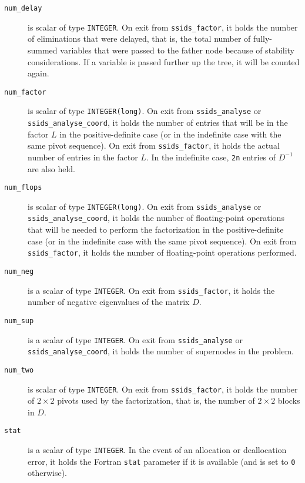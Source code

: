 \documentclass{spral}
\begin{document}
\begin{description}
\item[\texttt{num\_delay}] is scalar of type  {\tt INTEGER}. On exit from
{\tt ssids\_factor}, it holds the
number of eliminations that were
delayed, that is, the total number of fully-summed
variables that were passed to the father node because
of stability considerations. If a variable is passed
further up the tree, it will be counted again.

\item[\texttt{num\_factor}] is scalar of type {\tt INTEGER(long)}. On exit from
{\tt ssids\_analyse}  or {\tt ssids\_analyse\_coord}, it holds the number of entries that will be in the
factor $L$ in the positive-definite case (or in the indefinite case with
the same pivot sequence). On exit from
{\tt ssids\_factor},
it holds the actual number of entries in the factor
$L$. In the indefinite case, {\tt 2n} entries of ${D}^{-1}$ are
also held.

\item[\texttt{num\_flops}] is scalar of type {\tt INTEGER(long)}. On exit from
{\tt ssids\_analyse}  or {\tt ssids\_analyse\_coord}, it holds the number of
floating-point operations that
will be needed to perform the factorization
in the positive-definite case (or in the indefinite case  with
the same pivot sequence).  On exit from {\tt ssids\_factor}, it holds the
number of floating-point operations performed.

\item[\texttt{num\_neg}] is a scalar  of type  {\tt INTEGER}.
On exit from {\tt ssids\_factor}, it holds
the number of negative eigenvalues of the matrix $D$.


\item[\texttt{num\_sup}] is a scalar of type  {\tt INTEGER}.
On exit from {\tt ssids\_analyse}  or {\tt ssids\_analyse\_coord}, it holds
the number of supernodes in the problem.

\item[\texttt{num\_two}] is scalar of type  {\tt INTEGER}.
On exit from
{\tt ssids\_factor}, it holds the number
of $2 \times 2$ pivots used by the factorization, that is,
the number of $2 \times 2$ blocks in $D$.

\item[\texttt{stat}] is a scalar of type  {\tt INTEGER}.
In the event of an allocation or deallocation error, it
holds the Fortran {\tt stat} parameter if it is available
(and is set to {\tt 0} otherwise).

\end{description}
\end{document}
